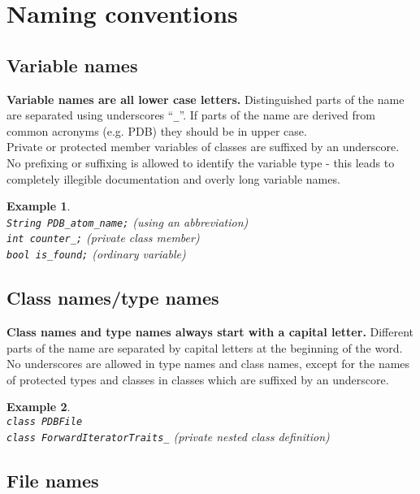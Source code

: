 \documentclass[a4paper,10pt]{article}
\newtheorem{example}{Example}
\begin{document}
\section{Naming conventions}


\subsection{Variable names}

{\bf Variable names are all lower case letters.} Distinguished parts of the name are
separated using underscores ``{\tt \_}''. If parts of the name are derived
from common acronyms (e.g. PDB) they should be in upper case.\\
Private or protected member variables of classes are suffixed by an
underscore.\\
No prefixing or suffixing is allowed to identify the variable type - this
leads to completely illegible documentation and overly long variable names.\\
\begin{example}\hspace*{2mm}\\
{\tt String PDB\_atom\_name;} (using an abbreviation)\\
{\tt int counter\_;} (private class member)\\
{\tt bool is\_found;} (ordinary variable)
\end{example}

\subsection{Class names/type names}

{\bf Class names and type names always start with a capital letter.} Different parts
of the name are separated by capital letters at the beginning of the word. No
underscores are allowed in type names and class names, except for the names of
protected types and classes in classes which are suffixed by an underscore.
\begin{example}\hspace*{2mm}\\
{\tt class PDBFile}\\
{\tt class ForwardIteratorTraits\_} (private nested class definition)\\
\end{example}

\subsection{File names}
\end{document}
